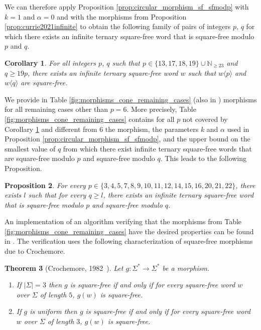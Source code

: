 \documentclass[12pt]{article}
\newtheorem{theorem}{Theorem}
\newtheorem{proposition}[theorem]{Proposition}
\newtheorem{corollary}[theorem]{Corollary}
\theoremstyle{definition}
\newcommand{\subsequence}[2]{#1\langle#2\rangle}
\begin{document}
We can therefore apply Proposition \ref{prop:circular_morphism_sf_sfmodp} with $k = 1$ and $\alpha = 0$ and with the morphisms from Proposition \ref{prop:currie2021infinite} to obtain the following family of pairs of integers $p$, $q$ for which there exists an infinite ternary square-free word that is square-free modulo $p$ and $q$.

\begin{corollary}\label{coro:construction_from_cyclic_morphisms} 
    For all integers $p$, $q$ such that $p \in \{13, 17, 18, 19\} \cup \mathbb{N}_{\ge 23}$ and $q \ge 19 p$, there exists an infinite ternary square-free word $w$ such that $\subsequence{w}{p}$ and $\subsequence{w}{q}$ are square-free.
\end{corollary}

We provide in Table \ref{fig:morphisms_cone_remaining_cases} (also in \cite[table\_\ref{fig:morphisms_cone_remaining_cases}\_morphisms.txt]{code}) morphisms for all remaining cases other than $p=6$. 
More precisely, Table \ref{fig:morphisms_cone_remaining_cases} contains for all $p$ not covered by Corollary \ref{coro:construction_from_cyclic_morphisms} and different from $6$ the morphism, the parameters $k$ and $\alpha$ used in Proposition \ref{prop:circular_morphism_sf_sfmodp}, and the upper bound on the smallest value of $q$ from which there exist infinite ternary square-free words that are square-free modulo $p$ and square-free modulo $q$. This leads to the following Proposition.
\begin{proposition}\label{prop:sparse_p_pairs}
    For every $p \in \{3, 4, 5, 7, 8, 9, 10, 11, 12, 14, 15, 16, 20, 21, 22\}$, there exists $l$ such that for every $q \geq l$, there exists an infinite ternary square-free word that is square-free modulo $p$ and square-free modulo $q$.
\end{proposition}


An implementation of an algorithm verifying that the morphisms from Table \ref{fig:morphisms_cone_remaining_cases} have the desired properties can be found in \cite[table\_\ref{fig:morphisms_cone_remaining_cases}.cpp]{code}. 
The verification uses the following characterization of square-free morphisms due to Crochemore.

\begin{theorem}[Crochemore, 1982~\cite{CROCHEMORE1982221}]\label{thm:crochemore}
    Let $g : \Sigma^* \rightarrow \Sigma^*$ be a morphism.
    \begin{enumerate}
        \item If $|\Sigma| = 3$ then $g$ is square-free if and only if for every square-free word $w$ over $\Sigma$ of length $5$, $g(w)$ is square-free.
        \item If $g$ is uniform then $g$ is square-free if and only if for every square-free word $w$ over $\Sigma$ of length $3$, $g(w)$ is square-free.
    \end{enumerate}
\end{theorem}
\end{document}
